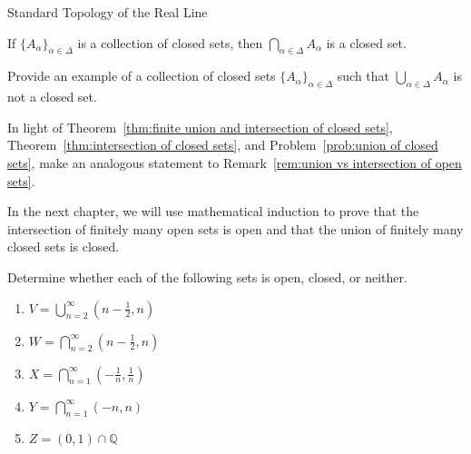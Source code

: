 \begin{section}{Standard Topology of the Real Line}
\begin{theorem}\label{thm:intersection of closed sets}
If $\{A_{\alpha}\}_{\alpha\in\Delta}$ is a collection of closed sets, then $\bigcap_{\alpha\in \Delta} A_{\alpha}$ is a closed set.
\end{theorem}


\begin{problem}\label{prob:union of closed sets}
Provide an example of a collection of closed sets $\{A_{\alpha}\}_{\alpha\in\Delta}$ such that $\bigcup_{\alpha\in \Delta} A_{\alpha}$ is not a closed set.
\end{problem}

\begin{problem}
In light of Theorem~\ref{thm:finite union and intersection of closed sets}, Theorem~\ref{thm:intersection of closed sets}, and Problem~\ref{prob:union of closed sets}, make an analogous statement to Remark~\ref{rem:union vs intersection of open sets}.
\end{problem}

In the next chapter, we will use mathematical induction to prove that the intersection of finitely many open sets is open and that the union of finitely many closed sets is closed.

\begin{problem}
Determine whether each of the following sets is open, closed, or neither.
\begin{enumerate}[label=\textrm{(\alph*)}]
\item $\displaystyle V=\bigcup_{n=2}^{\infty} \left(n - \frac{1}{2},n\right)$
\item $\displaystyle W=\bigcap_{n=2}^{\infty} \left(n - \frac{1}{2},n\right)$
\item $\displaystyle X=\bigcap_{n=1}^{\infty} \left(-\frac{1}{n}, \frac{1}{n}\right)$
\item $\displaystyle Y=\bigcap_{n=1}^{\infty} \left(-n, n\right)$
\item $Z=(0,1)\cap \mathbb{Q}$
\end{enumerate}
\end{problem}

\end{section}